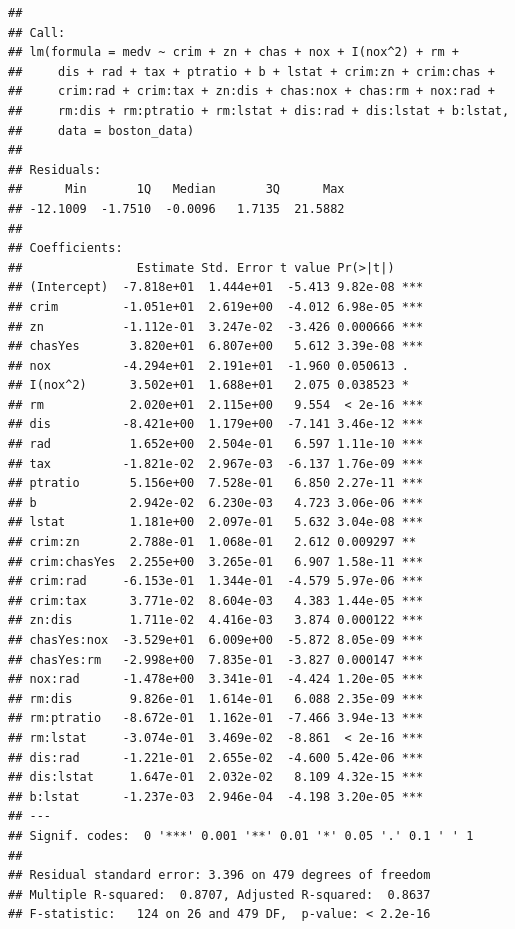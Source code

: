 \documentclass[
]{article}
\begin{document}
\begin{verbatim}
## 
## Call:
## lm(formula = medv ~ crim + zn + chas + nox + I(nox^2) + rm + 
##     dis + rad + tax + ptratio + b + lstat + crim:zn + crim:chas + 
##     crim:rad + crim:tax + zn:dis + chas:nox + chas:rm + nox:rad + 
##     rm:dis + rm:ptratio + rm:lstat + dis:rad + dis:lstat + b:lstat, 
##     data = boston_data)
## 
## Residuals:
##      Min       1Q   Median       3Q      Max 
## -12.1009  -1.7510  -0.0096   1.7135  21.5882 
## 
## Coefficients:
##                Estimate Std. Error t value Pr(>|t|)    
## (Intercept)  -7.818e+01  1.444e+01  -5.413 9.82e-08 ***
## crim         -1.051e+01  2.619e+00  -4.012 6.98e-05 ***
## zn           -1.112e-01  3.247e-02  -3.426 0.000666 ***
## chasYes       3.820e+01  6.807e+00   5.612 3.39e-08 ***
## nox          -4.294e+01  2.191e+01  -1.960 0.050613 .  
## I(nox^2)      3.502e+01  1.688e+01   2.075 0.038523 *  
## rm            2.020e+01  2.115e+00   9.554  < 2e-16 ***
## dis          -8.421e+00  1.179e+00  -7.141 3.46e-12 ***
## rad           1.652e+00  2.504e-01   6.597 1.11e-10 ***
## tax          -1.821e-02  2.967e-03  -6.137 1.76e-09 ***
## ptratio       5.156e+00  7.528e-01   6.850 2.27e-11 ***
## b             2.942e-02  6.230e-03   4.723 3.06e-06 ***
## lstat         1.181e+00  2.097e-01   5.632 3.04e-08 ***
## crim:zn       2.788e-01  1.068e-01   2.612 0.009297 ** 
## crim:chasYes  2.255e+00  3.265e-01   6.907 1.58e-11 ***
## crim:rad     -6.153e-01  1.344e-01  -4.579 5.97e-06 ***
## crim:tax      3.771e-02  8.604e-03   4.383 1.44e-05 ***
## zn:dis        1.711e-02  4.416e-03   3.874 0.000122 ***
## chasYes:nox  -3.529e+01  6.009e+00  -5.872 8.05e-09 ***
## chasYes:rm   -2.998e+00  7.835e-01  -3.827 0.000147 ***
## nox:rad      -1.478e+00  3.341e-01  -4.424 1.20e-05 ***
## rm:dis        9.826e-01  1.614e-01   6.088 2.35e-09 ***
## rm:ptratio   -8.672e-01  1.162e-01  -7.466 3.94e-13 ***
## rm:lstat     -3.074e-01  3.469e-02  -8.861  < 2e-16 ***
## dis:rad      -1.221e-01  2.655e-02  -4.600 5.42e-06 ***
## dis:lstat     1.647e-01  2.032e-02   8.109 4.32e-15 ***
## b:lstat      -1.237e-03  2.946e-04  -4.198 3.20e-05 ***
## ---
## Signif. codes:  0 '***' 0.001 '**' 0.01 '*' 0.05 '.' 0.1 ' ' 1
## 
## Residual standard error: 3.396 on 479 degrees of freedom
## Multiple R-squared:  0.8707, Adjusted R-squared:  0.8637 
## F-statistic:   124 on 26 and 479 DF,  p-value: < 2.2e-16
\end{verbatim}
\end{document}
